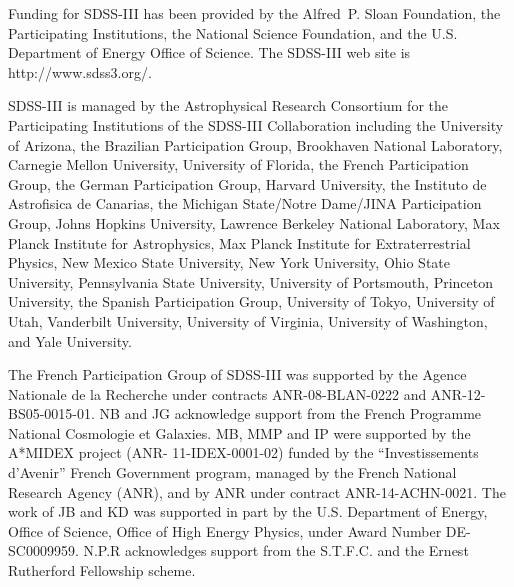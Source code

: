 
\begin{acknowledgements}
Funding for SDSS-III has been provided by the Alfred~P. Sloan Foundation, the Participating Institutions, the National Science Foundation, and the U.S. Department of Energy Office of Science. The SDSS-III web site is http://www.sdss3.org/.


SDSS-III is managed by the Astrophysical Research Consortium for the Participating Institutions of the SDSS-III Collaboration including the University of Arizona, the Brazilian Participation Group, Brookhaven National Laboratory, Carnegie Mellon University, University of Florida, the French Participation Group, the German Participation Group, Harvard University, the Instituto de Astrofisica de Canarias, the Michigan State/Notre Dame/JINA Participation Group, Johns Hopkins University, Lawrence Berkeley National Laboratory, Max Planck Institute for Astrophysics, Max Planck Institute for Extraterrestrial Physics, New Mexico State University, New York University, Ohio State University, Pennsylvania State University, University of Portsmouth, Princeton University, the Spanish Participation Group, University of Tokyo, University of Utah, Vanderbilt University, University of Virginia, University of Washington, and Yale University.


The French Participation Group of SDSS-III was supported by the
Agence Nationale de la
Recherche under contracts ANR-08-BLAN-0222 and ANR-12-BS05-0015-01.
NB and JG acknowledge support from the French Programme National Cosmologie et Galaxies.
MB, MMP and IP were supported by the A*MIDEX project (ANR- 11-IDEX-0001-02) funded by the “Investissements d’Avenir” French Government program, managed by the French National Research Agency (ANR), and by ANR under contract ANR-14-ACHN-0021.
The work of JB and KD was supported in part by the U.S. Department of Energy,
Office of Science, Office of High Energy Physics,
under Award Number DE-SC0009959.
N.P.R acknowledges support from the S.T.F.C. and the Ernest Rutherford
Fellowship scheme.

\end{acknowledgements}
